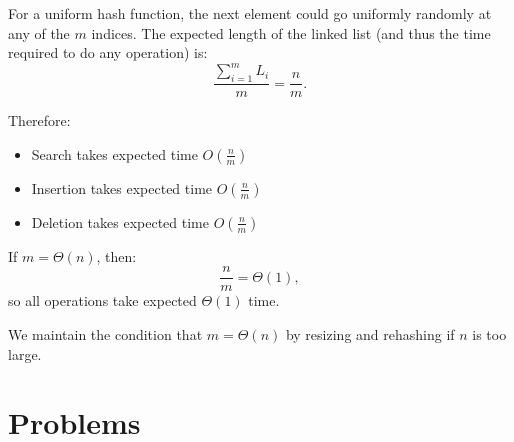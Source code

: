 \documentclass[11pt,openany]{book}
\begin{document}
For a uniform hash function, the next element could go uniformly randomly at any of the \(m\) indices.
The expected length of the linked list (and thus the time required to do any operation) is:
\[
\frac{\sum_{i=1}^m L_{i}}{m} = \frac{n}{m}.
\]


Therefore:
\begin{itemize}
\item Search takes expected time \(O\!\left(\frac{n}{m}\right)\)
\item Insertion takes expected time \(O\!\left(\frac{n}{m}\right)\)
\item Deletion takes expected time \(O\!\left(\frac{n}{m}\right)\)
\end{itemize}

If \(m = \Theta(n)\), then:
\[
\frac{n}{m} = \Theta(1),
\]
so all operations take expected \(\Theta(1)\) time.

We maintain the condition that \(m = \Theta(n)\) by resizing and rehashing if \(n\) is too large.

\section{Problems}
\end{document}
